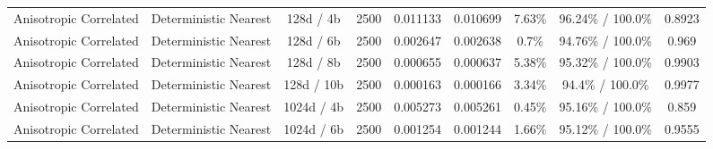 \documentclass[10pt,journal,compsoc]{IEEEtran}
\begin{document}
\begin{table}[!htbp]
\begin{tabular}{@{}llccccccc@{}}
Anisotropic Correlated & Deterministic Nearest & 128d / 4b & 2500 & 0.011133 & 0.010699 & 7.63\% & 96.24\% / 100.0\% & 0.8923 \\
Anisotropic Correlated & Deterministic Nearest & 128d / 6b & 2500 & 0.002647 & 0.002638 & 0.7\% & 94.76\% / 100.0\% & 0.969 \\
Anisotropic Correlated & Deterministic Nearest & 128d / 8b & 2500 & 0.000655 & 0.000637 & 5.38\% & 95.32\% / 100.0\% & 0.9903 \\
Anisotropic Correlated & Deterministic Nearest & 128d / 10b & 2500 & 0.000163 & 0.000166 & 3.34\% & 94.4\% / 100.0\% & 0.9977 \\
Anisotropic Correlated & Deterministic Nearest & 1024d / 4b & 2500 & 0.005273 & 0.005261 & 0.45\% & 95.16\% / 100.0\% & 0.859 \\
Anisotropic Correlated & Deterministic Nearest & 1024d / 6b & 2500 & 0.001254 & 0.001244 & 1.66\% & 95.12\% / 100.0\% & 0.9555 \\
\bottomrule\end{tabular}\end{table}
\end{document}
